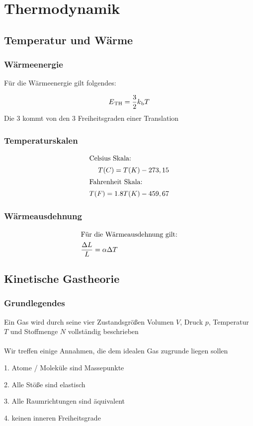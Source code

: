 \documentclass[a4paper,12pt]{report}
\begin{document}
\newpage
\chapter{Thermodynamik}


\section{Temperatur und Wärme}
\subsection{Wärmeenergie}

Für die Wärmeenergie gilt folgendes: 

\begin{align}
E \textsubscript{TH} = \frac{3}{2}k \textsubscript{b}T
\end{align}
Die 3 kommt von den 3 Freiheitsgraden einer Translation

\subsection{Temperaturskalen}

\begin{align}
\intertext{Celsius Skala:} 
T(C) = T(K) -273,15 \\
\intertext{Fahrenheit Skala:} 
T(F) = 1.8T(K) -459,67
\end{align}

\subsection{Wärmeausdehnung}

\begin{align}
\intertext{Für die Wärmeausdehnung gilt:}
\frac{\Delta L}{L} = \alpha  \Delta T
\end{align}

\section{Kinetische Gastheorie}
\subsection{Grundlegendes}
Ein Gas wird durch seine vier Zustandsgrößen  Volumen $V$, Druck $p$, Temperatur $T$ und Stoffmenge $N$ vollständig beschrieben \\
\\
Wir treffen einige Annahmen, die dem idealen Gas zugrunde liegen sollen
\begin{description}
\item 1. Atome / Moleküle sind Massepunkte
\item 2. Alle Stöße sind elastisch
\item 3. Alle Raumrichtungen sind äquivalent 
\item 4. keinen inneren Freiheitsgrade
\end{description}
\end{document}
